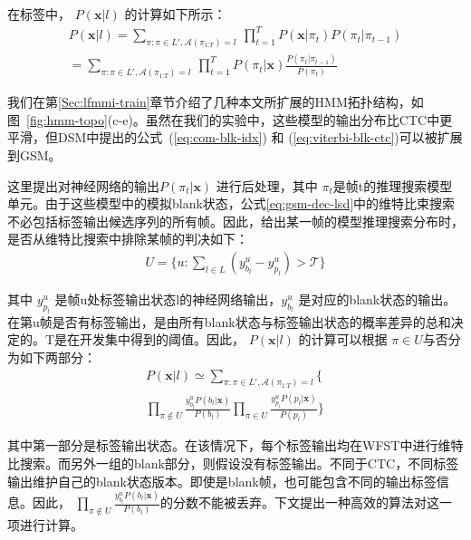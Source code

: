 在标签中， $P(\mathbf{x}|l)$ 的计算如下所示：
\begin{equation} \label{eq:viterbi-blk-gsm}
  \begin{split}
        P(\mathbf{x}|l)
        = \sum_{\pi:\pi \in L',\mathcal{A}(\pi_{1\mathord{:}T})=l}
          \ \prod_{t=1}^{T} P(\mathbf{x}|\pi_t)P(\pi_t|\pi_{t-1})\\
= \sum_{\pi:\pi \in L',\mathcal{A}(\pi_{1\mathord{:}T})=l}
          \ \prod_{t=1}^{T} P(\pi_t|\mathbf{x})\frac{P(\pi_t|\pi_{t-1})}{P(\pi_t)}
        \end{split}
       \end{equation}  

我们在第\ref{Sec:lfmmi-train}章节介绍了几种本文所扩展的HMM拓扑结构，如图~\ref{fig:hmm-topo}(c-e)。虽然在我们的实验中，这些模型的输出分布比CTC中更平滑，但DSM中提出的公式~(\ref{eq:com-blk-idx}) 和 (\ref{eq:viterbi-blk-ctc})可以被扩展到GSM。


这里提出对神经网络的输出$P(\pi_t|\mathbf{x})$ 进行后处理，其中 $\pi_t $是帧t的推理搜索模型单元。由于这些模型中的模拟blank状态，公式\ref{eq:gsm-dec-lsd}中的维特比束搜索不必包括标签输出候选序列的所有帧。因此，给出某一帧的模型推理搜索分布时，是否从维特比搜索中排除某帧的判决如下：
  \begin{equation} 
       \label{eq:com-blk-idx-gsm}
       \begin{split}
U=\{u:\sum_{l\in L}(y^{u}_{b_l}-y^{u}_{p_l})> \mathcal{T}\}
\end{split}
\end{equation}


其中 $y^{u}_{p_l}$ 是帧u处标签输出状态l的神经网络输出，$y^{u}_{b_l}$ 是对应的blank状态的输出。在第u帧是否有标签输出，是由所有blank状态与标签输出状态的概率差异的总和决定的。T是在开发集中得到的阈值。因此， $P(\mathbf{x}|l)$  的计算可以根据 $\pi\in U$与否分为如下两部分：
\begin{equation} \label{eq:viterbi-blk-hmm2}
  \begin{split}
P(\mathbf{x}|l)
\simeq\sum_{\pi:\pi \in L',\mathcal{A}(\pi_{1\mathord{:}T})=l}
         \{\   \\ %
         \prod_{\pi\not\in U}\frac{y_{b_l}^u P(b_l|\mathbf{x})}{P(b_l)} \prod_{\pi\in U}\frac{y_{p_l}^u P(p_l|\mathbf{x})}{P(p_l)}
         \}
         \end{split}
       \end{equation}   


其中第一部分是标签输出状态。在该情况下，每个标签输出均在WFST中进行维特比搜索。而另外一组的blank部分，则假设没有标签输出。不同于CTC，不同标签输出维护自己的blank状态版本。即使是blank帧，也可能包含不同的输出标签信息。因此， $\prod_{\pi\not\in U}\frac{y_{b_l}^u P(b_l|\mathbf{x})}{P(b_l)}$的分数不能被丢弃。下文提出一种高效的算法对这一项进行计算。

